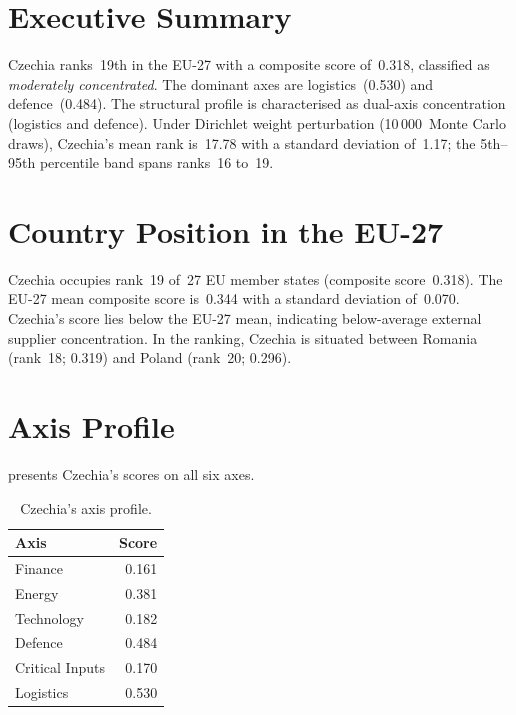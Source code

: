 \documentclass[12pt,a4paper]{article}
\begin{document}
\hypersetup{pageanchor=true}
\pagestyle{fancy}
\renewcommand{\headrulewidth}{0.4pt}


\section{Executive Summary}
\label{sec:summary}

Czechia ranks~19th in the EU-27 with a composite \ISI score of~0.318, classified as \emph{moderately concentrated}.  The dominant axes are logistics~(0.530) and defence~(0.484).  The structural profile is characterised as dual-axis concentration (logistics and defence).  Under Dirichlet weight perturbation (10\,000~Monte Carlo draws), Czechia's mean rank is~17.78 with a standard deviation of~1.17; the 5th--95th percentile band spans ranks~16 to~19.


\section{Country Position in the EU-27}
\label{sec:position}

Czechia occupies rank~19 of~27 EU member states (composite score~0.318).  The EU-27 mean composite score is~0.344 with a standard deviation of~0.070.  Czechia's score lies below the EU-27 mean, indicating below-average external supplier concentration.  In the ranking, Czechia is situated between Romania (rank~18; 0.319) and Poland (rank~20; 0.296).


\section{Axis Profile}
\label{sec:axis-profile}

 presents Czechia's scores on all six \ISI axes.

\begin{table}[htbp]
\centering\small
\caption{Czechia's \ISI axis profile.}
\label{tab:axis-profile}
\begin{tabular}{@{}lr@{}}
\toprule
\textbf{Axis} & \textbf{Score} \\
\midrule
    Finance           & 0.161 \\
    Energy            & 0.381 \\
    Technology        & 0.182 \\
    Defence           & 0.484 \\
    Critical Inputs   & 0.170 \\
    Logistics         & 0.530 \\
\bottomrule
\end{tabular}
\end{table}
\end{document}
